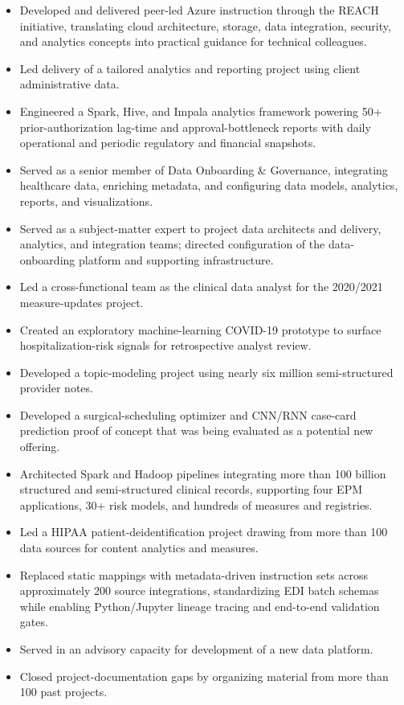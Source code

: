 \begin{itemize}
  \item Developed and delivered peer-led Azure instruction through the REACH initiative, translating cloud architecture, storage, data integration, security, and analytics concepts into practical guidance for technical colleagues.
  \item Led delivery of a tailored analytics and reporting project using client administrative data.
  \item Engineered a Spark, Hive, and Impala analytics framework powering 50+ prior-authorization lag-time and approval-bottleneck reports with daily operational and periodic regulatory and financial snapshots.
\end{itemize}

\begin{itemize}
  \item Served as a senior member of Data Onboarding \& Governance, integrating healthcare data, enriching metadata, and configuring data models, analytics, reports, and visualizations.
  \item Served as a subject-matter expert to project data architects and delivery, analytics, and integration teams; directed configuration of the data-onboarding platform and supporting infrastructure.
  \item Led a cross-functional team as the clinical data analyst for the 2020/2021 measure-updates project.
  \item Created an exploratory machine-learning COVID-19 prototype to surface hospitalization-risk signals for retrospective analyst review.
  \item Developed a topic-modeling project using nearly six million semi-structured provider notes.
  \item Developed a surgical-scheduling optimizer and CNN/RNN case-card prediction proof of concept that was being evaluated as a potential new offering.
  \item Architected Spark and Hadoop pipelines integrating more than 100 billion structured and semi-structured clinical records, supporting four EPM applications, 30+ risk models, and hundreds of measures and registries.
  \item Led a HIPAA patient-deidentification project drawing from more than 100 data sources for content analytics and measures.
  \item Replaced static mappings with metadata-driven instruction sets across approximately 200 source integrations, standardizing EDI batch schemas while enabling Python/Jupyter lineage tracing and end-to-end validation gates.
  \item Served in an advisory capacity for development of a new data platform.
  \item Closed project-documentation gaps by organizing material from more than 100 past projects.
\end{itemize}


